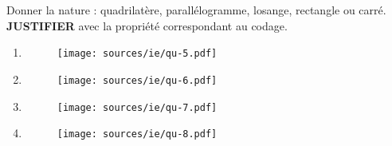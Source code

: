 \documentclass[11pt]{article}
\begin{document}
Donner la nature : quadrilatère, parallélogramme, losange, rectangle ou carré. \textbf{JUSTIFIER} avec la propriété correspondant au codage.
\begin{multicols}{2}
  \begin{enumerate}
  \item 
    \begin{figure}[H]
      \centering
      \texttt{[image: sources/ie/qu-5.pdf]}
    \end{figure}
  \item
    \begin{figure}[H]
      \centering
      \texttt{[image: sources/ie/qu-6.pdf]}
    \end{figure}
  \item 
    \begin{figure}[H]
      \centering
      \texttt{[image: sources/ie/qu-7.pdf]}
    \end{figure}
  \item  
    \begin{figure}[H]
      \centering
      \texttt{[image: sources/ie/qu-8.pdf]}
    \end{figure}
  \end{enumerate}
\end{multicols}
\end{document}
